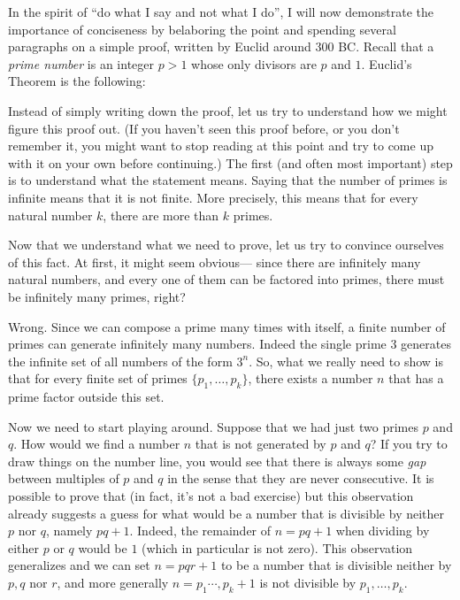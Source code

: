 In the spirit of ``do what I say and not what I do'', I will now
demonstrate the importance of conciseness by belaboring the point and
spending several paragraphs on a simple proof, written by Euclid around
300 BC. Recall that a \emph{prime number} is an integer \(p>1\) whose
only divisors are \(p\) and \(1\). Euclid's Theorem is the following:

\hypertarget{infprimesthm}{}

Instead of simply writing down the proof, let us try to understand how
we might figure this proof out. (If you haven't seen this proof before,
or you don't remember it, you might want to stop reading at this point
and try to come up with it on your own before continuing.) The first
(and often most important) step is to understand what the statement
means. Saying that the number of primes is infinite means that it is not
finite. More precisely, this means that for every natural number \(k\),
there are more than \(k\) primes.

Now that we understand what we need to prove, let us try to convince
ourselves of this fact. At first, it might seem obvious--- since there
are infinitely many natural numbers, and every one of them can be
factored into primes, there must be infinitely many primes, right?

Wrong. Since we can compose a prime many times with itself, a finite
number of primes can generate infinitely many numbers. Indeed the single
prime \(3\) generates the infinite set of all numbers of the form
\(3^n\). So, what we really need to show is that for every finite set of
primes \(\{ p_1,\ldots,p_k\}\), there exists a number \(n\) that has a
prime factor outside this set.

Now we need to start playing around. Suppose that we had just two primes
\(p\) and \(q\). How would we find a number \(n\) that is not generated
by \(p\) and \(q\)? If you try to draw things on the number line, you
would see that there is always some \emph{gap} between multiples of
\(p\) and \(q\) in the sense that they are never consecutive. It is
possible to prove that (in fact, it's not a bad exercise) but this
observation already suggests a guess for what would be a number that is
divisible by neither \(p\) nor \(q\), namely \(pq+1\). Indeed, the
remainder of \(n=pq+1\) when dividing by either \(p\) or \(q\) would be
\(1\) (which in particular is not zero). This observation generalizes
and we can set \(n=pqr+1\) to be a number that is divisible neither by
\(p,q\) nor \(r\), and more generally \(n=p_1\cdots, p_k +1\) is not
divisible by \(p_1,\ldots,p_k\).

